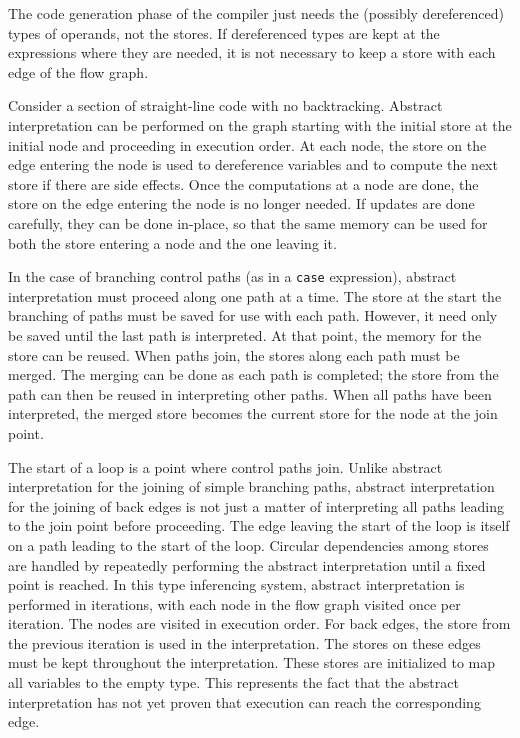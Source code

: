 The code generation phase of the compiler just needs the (possibly
dereferenced) types of operands, not the stores. If dereferenced types
are kept at the expressions where they are needed, it is not necessary
to keep a store with each edge of the flow graph.

Consider a section of straight-line code with no
backtracking. Abstract interpretation can be performed on the graph
starting with the initial store at the initial node and proceeding in
execution order. At each node, the store on the edge entering the node
is used to dereference variables and to compute the next store if
there are side effects. Once the computations at a node are done, the
store on the edge entering the node is no longer needed. If updates
are done carefully, they can be done in-place, so that the same memory
can be used for both the store entering a node and the one leaving it.

In the case of branching control paths (as in a \texttt{case} expression),
abstract interpretation must proceed along one path at a time. The
store at the start the branching of paths must be saved for use with
each path. However, it need only be saved until the last path is
interpreted. At that point, the memory for the store can be
reused. When paths join, the stores along each path must be
merged. The merging can be done as each path is completed; the store
from the path can then be reused in interpreting other paths. When all
paths have been interpreted, the merged store becomes the current
store for the node at the join point.

The start of a loop is a point where control paths join. Unlike
abstract interpretation for the joining of simple branching paths,
abstract interpretation for the joining of back edges is not just a
matter of interpreting all paths leading to the join point before
proceeding. The edge leaving the start of the loop is itself on a path
leading to the start of the loop. Circular dependencies among stores
are handled by repeatedly performing the abstract interpretation until
a fixed point is reached. In this type inferencing system, abstract
interpretation is performed in iterations, with each node in the flow
graph visited once per iteration. The nodes are visited in execution
order. For back edges, the store from the previous iteration is used
in the interpretation. The stores on these edges must be kept
throughout the interpretation. These stores are initialized to map all
variables to the empty type. This represents the fact that the
abstract interpretation has not yet proven that execution can reach
the corresponding edge.

